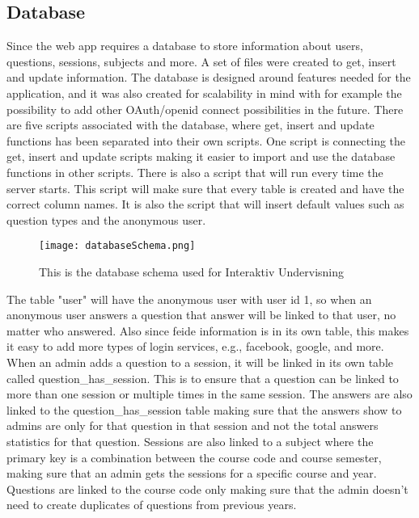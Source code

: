 \subsection{Database}
Since the web app requires a database to store information about users, questions, sessions, subjects and more. A set of files were created to get, insert and update information. The database is designed around features needed for the application, and it was also created for scalability in mind with for example the possibility to add other OAuth/openid connect possibilities in the future. There are five scripts associated with the database, where get, insert and update functions has been separated into their own scripts. One script is connecting the get, insert and update scripts making it easier to import and use the database functions in other scripts. There is also a script that will run every time the server starts. This script will make sure that every table is created and have the correct column names. It is also the script that will insert default values such as question types and the anonymous user.
\begin{figure}[h]
    \centering
    \texttt{[image: databaseSchema.png]}
    \caption{This is the database schema used for Interaktiv Undervisning}
    \label{fig:dbSchema}
\end{figure}
The table "user" will have the anonymous user with user id 1, so when an anonymous user answers a question that answer will be linked to that user, no matter who answered. Also since feide information is in its own table, this makes it easy to add more types of login services, e.g., facebook, google, and more. When an admin adds a question to a session, it will be linked in its own table called question\_has\_session. This is to ensure that a question can be linked to more than one session or multiple times in the same session. The answers are also linked to the question\_has\_session table making sure that the answers show to admins are only for that question in that session and not the total answers statistics for that question. Sessions are also linked to a subject where the primary key is a combination between the course code and course semester, making sure that an admin gets the sessions for a specific course and year. Questions are linked to the course code only making sure that the admin doesn't need to create duplicates of questions from previous years.